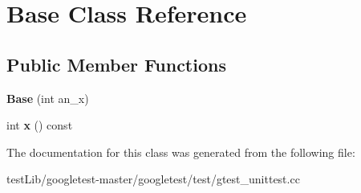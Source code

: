 \hypertarget{classBase}{}\section{Base Class Reference}
\label{classBase}
\subsection*{Public Member Functions}
\begin{DoxyCompactItemize}
\item 
\mbox{\label{classBase_a1d5f3fb92f8cbc687705785bdc6abd18}} 
{\bfseries Base} (int an\+\_\+x)
\item 
\mbox{\label{classBase_a779fd2b157ebd763b15383d96047e07c}} 
int {\bfseries x} () const
\end{DoxyCompactItemize}


The documentation for this class was generated from the following file\+:\begin{DoxyCompactItemize}
\item 
test\+Lib/googletest-\/master/googletest/test/gtest\+\_\+unittest.\+cc\end{DoxyCompactItemize}
